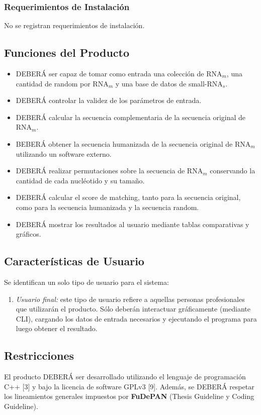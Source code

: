 \documentclass[12pt,a4paper,spanish]{article}
\begin{document}
	\subsubsection{Requerimientos de Instalación}
		No se registran requerimientos de instalación.

\subsection{Funciones del Producto}
	\begin{itemize}
		\item DEBERÁ ser capaz de tomar como entrada una colección de RNA$_m$, una cantidad de random por RNA$_m$ y una base de datos de small-RNA$_s$. 
		\item DEBERÁ controlar la validez de los parámetros de entrada.
		\item DEBERÁ calcular la secuencia complementaria de la secuencia original de RNA$_m$.
		\item BEBERÁ obtener la secuencia humanizada de la secuencia original de RNA$_m$ utilizando un software externo.
		\item DEBERÁ realizar permutaciones sobre la secuencia de RNA$_m$ conservando la cantidad de cada nucléotido y su tamaño.
		\item DEBERÁ calcular el score de matching, tanto para la secuencia original, como para la secuencia humanizada y la secuencia random.	
		\item DEBERÁ mostrar los resultados al usuario mediante tablas comparativas y gráficos.		
	\end{itemize}

\subsection{Características de Usuario}
	Se identifican un solo tipo de usuario para el sistema:
	\begin{enumerate}
 		\item \textit{Usuario final:} este tipo de usuario refiere a aquellas personas profesionales que utilizarán el 										producto. Sólo deberán interactuar gráficamente (mediante CLI), cargando los datos de entrada 										necesarios y ejecutando el programa para luego obtener el resultado. 
	\end{enumerate}

\subsection{Restricciones}
	El producto DEBERÁ ser desarrollado utilizando el lenguaje de programación C++ [3] y bajo la licencia de software GPLv3 [9]. Además, se DEBERÁ respetar los lineamientos generales impuestos por \textbf{FuDePAN} (Thesis Guideline y Coding Guideline). 
\end{document}
